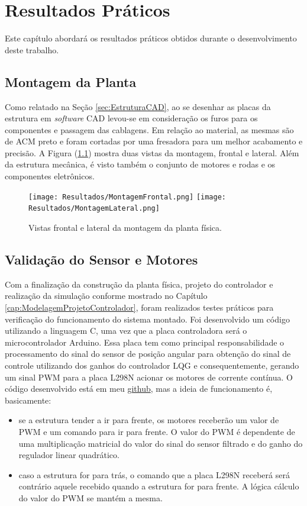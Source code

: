 \chapter{Resultados Práticos}

Este capítulo abordará os resultados práticos obtidos durante o desenvolvimento deste trabalho.

\section{Montagem da Planta}

Como relatado na Seção \ref{sec:EstruturaCAD}, ao se desenhar as placas da estrutura em \textit{software} CAD levou-se em consideração os furos para os componentes e passagem das cablagens. Em relação ao material, as mesmas são de ACM preto e foram cortadas por uma fresadora para um melhor acabamento e precisão. A Figura (\ref{fig:vistasMontagemPlanta}) mostra duas vistas da montagem, frontal e lateral. Além da estrutura mecânica, é visto também o conjunto de motores e rodas e os componentes eletrônicos.

\begin{figure}[H]
\centering
\texttt{[image: Resultados/MontagemFrontal.png]}
\texttt{[image: Resultados/MontagemLateral.png]}
\caption{Vistas frontal e lateral da montagem da planta física.}
\label{fig:vistasMontagemPlanta} 
\end{figure}

\section{Validação do Sensor e Motores}

Com a finalização da construção da planta física, projeto do controlador e realização da simulação conforme mostrado no Capítulo \ref{cap:ModelagemProjetoControlador}, foram realizados testes práticos para verificação do funcionamento do sistema montado. Foi desenvolvido um código utilizando a linguagem C, uma vez que a placa controladora será o microcontrolador Arduino. Essa placa tem como principal responsabilidade o processamento do sinal do sensor de posição angular para obtenção do sinal de controle utilizando dos ganhos do controlador LQG e consequentemente, gerando um sinal PWM para a placa L298N acionar os motores de corrente contínua. O código desenvolvido está em meu \href{https://github.com/mferreiracosta/tcc_cefet.git}{github}, mas a ideia de funcionamento é, basicamente:

\begin{itemize}
    \item se a estrutura tender a ir para frente, os motores receberão um valor de PWM e um comando para ir para frente. O valor do PWM é dependente de uma multiplicação matricial do valor do sinal do sensor filtrado e do ganho do regulador linear quadrático.
    \item caso a estrutura for para trás, o comando que a placa L298N receberá será contrário aquele recebido quando a estrutura for para frente. A lógica cálculo do valor do PWM se mantém a mesma.
\end{itemize}

